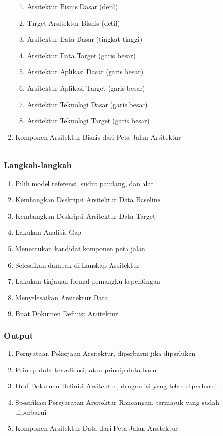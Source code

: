 \documentclass[aspectratio=169]{beamer}
\begin{document}
\begin{frame}
\begin{columns}
\begin{column}{0.5\textwidth}
\begin{center}
\begin{enumerate}
						\begin{enumerate}
							\item Arsitektur Bisnis Dasar (detil)
							\item Target Arsitektur Bisnis (detil)
							\item Arsitektur Data Dasar (tingkat tinggi)
							\item Arsitektur Data Target (garis besar)
							\item Arsitektur Aplikasi Dasar (garis besar)
							\item Arsitektur Aplikasi Target (garis besar)
							\item Arsitektur Teknologi Dasar (garis besar)
							\item Arsitektur Teknologi Target (garis besar)
						\end{enumerate}
						\item Komponen Arsitektur Bisnis dari Peta Jalan Arsitektur
					\end{enumerate}
				\end{center}
			\end{column}
		\end{columns}
	\end{frame}
	
	\begin{frame}
		\frametitle{Langkah-langkah}
		\begin{enumerate}
			\item Pilih model referensi, sudut pandang, dan alat
			\item Kembangkan Deskripsi Arsitektur Data Baseline
			\item Kembangkan Deskripsi Arsitektur Data Target
			\item Lakukan Analisis Gap
			\item Menentukan kandidat komponen peta jalan
			\item Selesaikan dampak di Lanskap Arsitektur
			\item Lakukan tinjauan formal pemangku kepentingan
			\item Menyelesaikan Arsitektur Data
			\item Buat Dokumen Definisi Arsitektur
		\end{enumerate}
	\end{frame}
	
	\begin{frame}
		\frametitle{Output}
		\begin{enumerate}
			\item Pernyataan Pekerjaan Arsitektur, diperbarui jika diperlukan
			\item Prinsip data tervalidasi, atau prinsip data baru
			\item Draf Dokumen Definisi Arsitektur, dengan isi yang telah diperbarui
			\item Spesifikasi Persyaratan Arsitektur Rancangan, termasuk yang sudah diperbarui
			\item Komponen Arsitektur Data dari Peta Jalan Arsitektur
		\end{enumerate}
	\end{frame}
	
\end{document}
